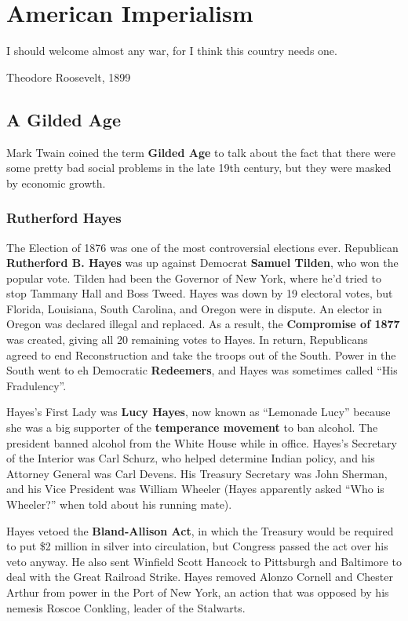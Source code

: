 \chapter{American Imperialism}

\epigraph{%
  I should welcome almost any war, for I think this country needs one.
}{Theodore Roosevelt, 1899}

\section{A Gilded Age}

Mark Twain coined the term \textbf{Gilded Age} to talk about the fact that there were some pretty bad social problems
in the late 19th century, but they were masked by economic growth.

\subsection*{Rutherford Hayes}

The Election of 1876 was one of the most controversial elections ever.
Republican \textbf{Rutherford B. Hayes} was up against Democrat \textbf{Samuel Tilden}, who won the popular vote.
Tilden had been the Governor of New York, where he'd tried to stop Tammany Hall and Boss Tweed.
Hayes was down by 19 electoral votes, but Florida, Louisiana, South Carolina, and Oregon were in dispute.
An elector in Oregon was declared illegal and replaced.
As a result, the \textbf{Compromise of 1877} was created, giving all 20 remaining votes to Hayes.
In return, Republicans agreed to end Reconstruction and take the troops out of the South.
Power in the South went to eh Democratic \textbf{Redeemers},
and Hayes was sometimes called ``His Fradulency''.

Hayes's First Lady was \textbf{Lucy Hayes},
now known as ``Lemonade Lucy'' because she was a big supporter of the \textbf{temperance movement} to ban alcohol.
The president banned alcohol from the White House while in office.
Hayes's Secretary of the Interior was Carl Schurz, who helped determine Indian policy,
and his Attorney General was Carl Devens.
His Treasury Secretary was John Sherman,
and his Vice President was William Wheeler
(Hayes apparently asked ``Who is Wheeler?'' when told about his running mate).

Hayes vetoed the \textbf{Bland-Allison Act},
in which the Treasury would be required to put \$2 million in silver into circulation,
but Congress passed the act over his veto anyway.
He also sent Winfield Scott Hancock to Pittsburgh and Baltimore to deal with the Great Railroad Strike.
Hayes removed Alonzo Cornell and Chester Arthur from power in the Port of New York,
an action that was opposed by his nemesis Roscoe Conkling, leader of the Stalwarts.

